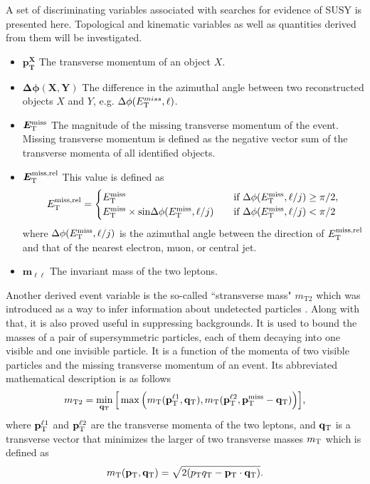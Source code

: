 A set of discriminating variables associated with searches for evidence of SUSY is presented here. Topological and kinematic variables as well as quantities derived from them will be investigated.

\begin{itemize}[leftmargin=0cm]
\item[]$\bm{p^X_T}$ The transverse momentum of an object $X$.
\item[]$\bm{\Delta\phi(X,Y)}$ The difference in the azimuthal angle between two reconstructed objects $X$ and $Y$, e.g. ${\Delta\phi(E_{\text T}^{miss},\ell)}$.
\item[]$\bm{E_{\text T}^{\text {miss}}}$ The magnitude of the missing transverse momentum of the event. Missing transverse momentum is defined as the negative vector sum of the transverse momenta of all identified objects.
\item[]$\bm{E^{\text{miss,rel}}_{\text T}}$ This value is defined as 
\[
 E_{\text T}^{\text {miss,rel}} = 
  \begin{cases} 
   E_{\text T}^{\text {miss}}\quad & \text{if } \Delta\phi(E_{\text T}^{\text {miss}},\ell/j) \geq \pi/2, \\
   E_{\text T}^{\text {miss}}\times \text{sin}\Delta\phi(E_{\text T}^{\text {miss}},\ell/j) \quad      & \text{if } \Delta\phi(E_{\text T}^{\text {miss}},\ell/j)<\pi/2
  \end{cases}
\]
where $\Delta\phi(E_{\text T}^{\text {miss}},\ell/j)$ is the azimuthal angle between the direction of $E_{\text T}^{\text {miss,rel}}$ and that of the nearest electron, muon, or central jet. 
\item[]$\bm{m_{\ell \ell}}$ The invariant mass of the two leptons.
\end{itemize}

Another derived event variable is the so-called ``stransverse mass"  $m_{\text {T2}}$ which was introduced as a way to infer information about undetected particles \citep{Lester:1999tx,Barr:2003rg}. Along with that, it is also proved useful in suppressing backgrounds. It is used to bound the masses of a pair of supersymmetric particles, each of them decaying into one visible and one invisible particle. It is a function of the momenta of two visible particles and the missing transverse momentum of an event. Its abbreviated mathematical description is as follows
\begin{equation}
m_{\text{T2}} = \min_{\mathbf{q}_{\text T}}\Big [\max \Big ( m_{\text T} (\mathbf{p}_{\text T}^{\ell 1},\mathbf{q}_{\text T}),m_{\text T}(\mathbf{p}_{\text T}^{\ell 2},\mathbf{p}_{\text T}^{\text{miss}}-\mathbf{q}_{\text T}) \Big ) \Big ] ,
\end{equation}
where $\mathbf{p}_{\text T}^{\ell 1}$ and $\mathbf{p}_{\text T}^{\ell 2}$ are the transverse momenta of the two leptons, and $ \mathbf{q}_{\text T}$ is a transverse vector that minimizes the larger of two transverse masses $m_{\text T}$ which is defined as
\begin{equation}
m_{\text T}(\mathbf{p}_{\text T},\mathbf{q}_{\text T}) = \sqrt{2(p_{\text T}q_{\text T} - \mathbf{p}_{\text T} \cdot \mathbf{q}_{\text T})}.
\end{equation}

